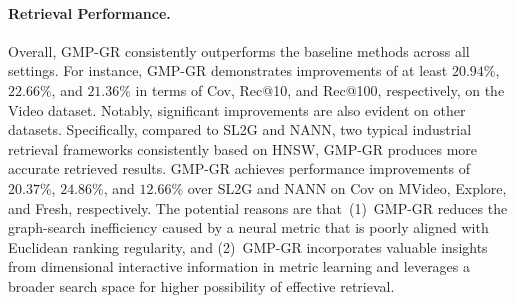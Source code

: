 \paragraph{Retrieval Performance.}
Overall, GMP-GR consistently outperforms the baseline methods across all settings. For instance, GMP-GR demonstrates improvements of at least $20.94\%$, $22.66\%$, and $21.36\%$ in terms of Cov, Rec@10, and Rec@100, respectively, on the Video dataset. Notably, significant improvements are also evident on other datasets.
Specifically, compared to SL2G and NANN, two typical industrial retrieval frameworks consistently based on HNSW, GMP-GR produces more accurate retrieved results. GMP-GR achieves performance improvements of $20.37\%$, $24.86\%$, and $12.66\%$ over SL2G and NANN on Cov on MVideo, Explore, and Fresh, respectively. The potential reasons are that~(1)~GMP-GR reduces the graph-search inefficiency caused by a neural metric that is poorly aligned with Euclidean ranking regularity, and (2)~GMP-GR incorporates valuable insights from dimensional interactive information in metric learning and leverages a broader search space for higher possibility of effective retrieval.

